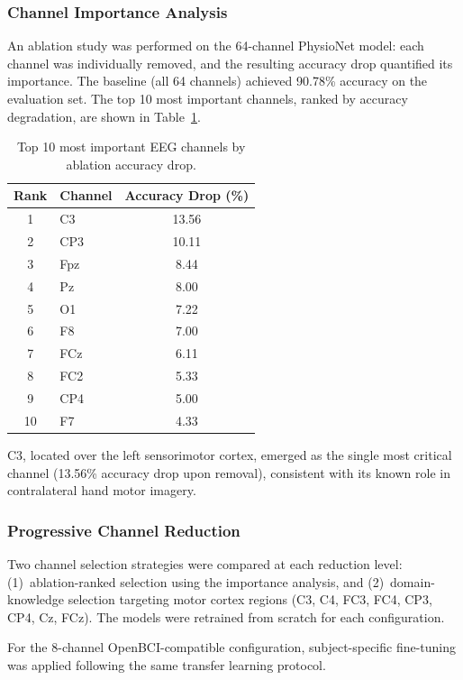 \documentclass[12pt, a4paper]{article}
\begin{document}
\subsubsection{Channel Importance Analysis}

An ablation study was performed on the 64-channel PhysioNet model: each channel was individually removed, and the resulting accuracy drop quantified its importance. The baseline (all 64 channels) achieved 90.78\% accuracy on the evaluation set. The top 10 most important channels, ranked by accuracy degradation, are shown in Table~\ref{tab:channel_importance}.

\begin{table}[htbp]
\centering
\caption{Top 10 most important EEG channels by ablation accuracy drop.}
\label{tab:channel_importance}
\begin{tabular}{clc}
\toprule
\textbf{Rank} & \textbf{Channel} & \textbf{Accuracy Drop (\%)} \\
\midrule
1 & C3   & 13.56 \\
2 & CP3  & 10.11 \\
3 & Fpz  & 8.44 \\
4 & Pz   & 8.00 \\
5 & O1   & 7.22 \\
6 & F8   & 7.00 \\
7 & FCz  & 6.11 \\
8 & FC2  & 5.33 \\
9 & CP4  & 5.00 \\
10 & F7  & 4.33 \\
\bottomrule
\end{tabular}
\end{table}

C3, located over the left sensorimotor cortex, emerged as the single most critical channel (13.56\% accuracy drop upon removal), consistent with its known role in contralateral hand motor imagery.

\subsubsection{Progressive Channel Reduction}

Two channel selection strategies were compared at each reduction level: (1)~ablation-ranked selection using the importance analysis, and (2)~domain-knowledge selection targeting motor cortex regions (C3, C4, FC3, FC4, CP3, CP4, Cz, FCz). The models were retrained from scratch for each configuration.

For the 8-channel OpenBCI-compatible configuration, subject-specific fine-tuning was applied following the same transfer learning protocol.
\end{document}
